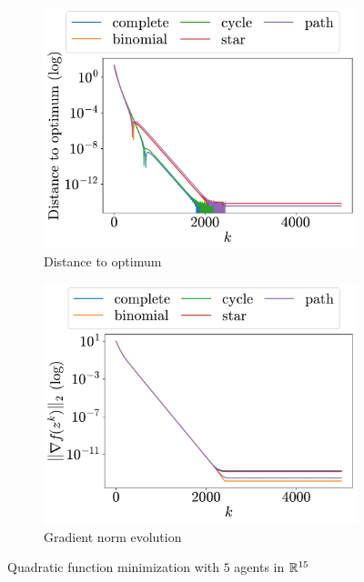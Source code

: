 \documentclass[a4paper,11pt,oneside]{book}
\begin{document}
\begin{figure}[H]
      \centering
      \begin{subfigure}[t]{0.46\linewidth}
            \centering
            \includegraphics[width=\linewidth]{./figs/quadratic/5_15/distance.pdf} 
            \caption{Distance to optimum}
      \end{subfigure}
      \hfill
      \begin{subfigure}[t]{0.46\linewidth}
            \centering
            \includegraphics[width=\linewidth]{./figs/quadratic/5_15/gradient.pdf} 
            \caption{Gradient norm evolution}
      \end{subfigure}
      \caption{Quadratic function minimization with $5$ agents in ${\mathbb{R}}^{15}$}
      \label{fig:quadratic_5_15}
\end{figure}
\end{document}

